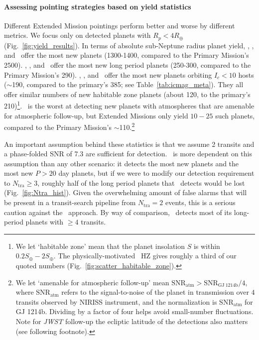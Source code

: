 \paragraph{Assessing pointing strategies based on yield statistics} 
Different Extended Mission pointings perform better and worse by different metrics.
We focus only on detected planets with $R_p<4R_\oplus$ (Fig.~\ref{fig:yield_results}).
In terms of absolute sub-Neptune radius planet yield, \hemis, \npole, and \shemiAvoid\ offer the most new planets (1300-1400, compared to the Primary Mission's 2500).
\hemis, \npole, and \nhemi\ offer the most new long period planets (250-300, compared to the Primary Mission's 290).
\hemis, \shemiAvoid, and \eshort\ offer the most new planets orbiting $I_c<10$ hosts ($\sim$190, compared to the primary's 385; see Table~\ref{tab:icmag_meta}).
They all offer similar numbers of new habitable zone planets (about 120, to the primary's 210)\footnote{We let `habitable zone' mean that the planet insolation $S$ is within $0.2S_\oplus-2S_\oplus$. The physically-motivated~\protect\citet{kopparapu_habitable_2013} HZ gives roughly a third of our quoted numbers (Fig.~\protect\ref{fig:scatter_habitable_zone}).}.
\npole\ is the worst at detecting new planets with atmospheres that are amenable for atmospheric follow-up, but Extended Missions only yield $10-25$ such planets, compared to the Primary Mission's $\sim$110.\footnote{We let `amenable for atmospheric follow-up' mean $\mathrm{SNR}_\mathrm{atm} > \mathrm{SNR}_\mathrm{GJ\ 1214b}/4 $, where $\mathrm{SNR}_\mathrm{atm}$ refers to the signal-to-noise of the planet in transmission over 4 transits observed by \jwsts NIRISS instrument, and the normalization is $\mathrm{SNR}_\mathrm{atm}$ for GJ 1214b. Dividing by a factor of four helps avoid small-number fluctuations. Note for \textit{JWST} follow-up the ecliptic latitude of the detections also matters (see following footnote).}

An important assumption behind these statistics is that we assume 2 transits and a phase-folded SNR of 7.3 are sufficient for detection.
\hemis\ is more dependent on this assumption than any other scenario: it detects the most new planets and the most new $P>20$ day planets, but if we were to modify our detection requirement to $N_\mathrm{tra}\geq 3$, roughly half of the long period planets that \hemis\ detects would be lost (Fig.~\ref{fig:Ntra_hist}).
Given the overwhelming amount of false alarms that will be present in a transit-search pipeline from $N_\mathrm{tra} = 2$ events, this is a serious caution against the \hemis\ approach.
By way of comparison, \npole\ detects most of its long-period planets with $\ge 4$ transits.


